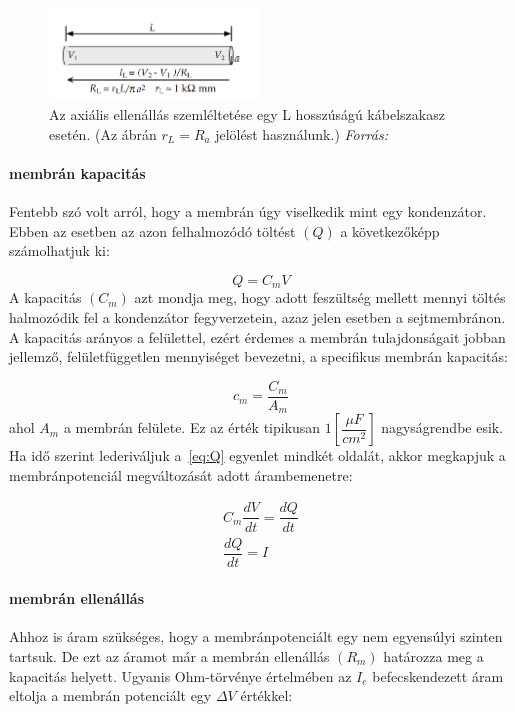 \begin{figure}[h!]
	\centering
	\includegraphics[width=0.5\textwidth]{./fig/Ra.png}
	\caption[Axiális ellenállás]{Az axiális ellenállás szemléltetése egy L hosszúságú kábelszakasz esetén. (Az ábrán $r_L = R_a$ jelölést használunk.) \textit{Forrás:}\cite{dayan2001theoretical} }
	\label{fig:Ra}
\end{figure}


\FloatBarrier
\paragraph{membrán kapacitás}
Fentebb szó volt arról, hogy a membrán úgy viselkedik mint egy kondenzátor. Ebben az esetben az azon felhalmozódó töltést $(Q)$ a következőképp számolhatjuk ki:

\begin{equation}\label{eq:Q}
	Q = C_m V 
\end{equation}
A kapacitás $(C_m)$ azt mondja meg, hogy adott feszültség mellett mennyi töltés halmozódik fel a kondenzátor fegyverzetein, azaz jelen esetben a sejtmembránon. A kapacitás arányos a felülettel, ezért érdemes a membrán tulajdonságait jobban jellemző, felületfüggetlen mennyiséget bevezetni, a specifikus membrán kapacitás:

\begin{equation}\label{eq:cm}
	c_m = \frac{C_m}{A_m}
\end{equation}
ahol $A_m$ a membrán felülete. Ez az érték tipikusan $1 \left[ \dfrac{\mu F}{cm^2}\right]$ nagyságrendbe esik.
Ha idő szerint lederiváljuk a~\ref{eq:Q} egyenlet mindkét oldalát, akkor megkapjuk a membránpotenciál megváltozását adott árambemenetre:

\begin{gather}\label{eq:dV}
	C_m \dfrac{dV}{dt} = \dfrac{dQ}{dt} \\
	\dfrac{dQ}{dt} = I
\end{gather}

\paragraph{membrán ellenállás}
Ahhoz is áram szükséges, hogy a membránpotenciált egy nem egyensúlyi szinten tartsuk. De ezt az áramot már a membrán ellenállás $(R_m)$ határozza meg a kapacitás helyett. Ugyanis Ohm-törvénye értelmében az $I_e$ befecskendezett áram eltolja a membrán potenciált egy $\Delta V$ értékkel:

